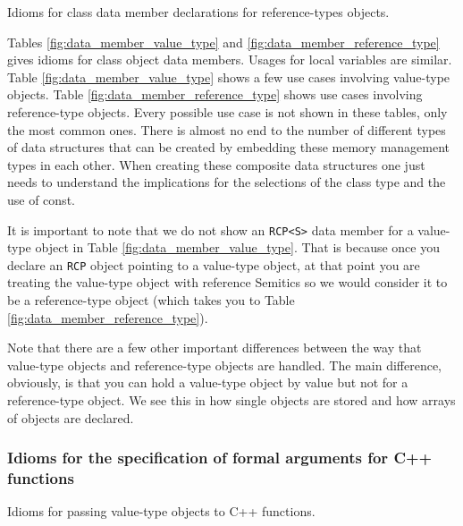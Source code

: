 \documentclass[pdf,ps2pdf,11pt]{SANDreport}
\begin{document}
\begin{table}
%
\begin{center}
%
%

%
%
\end{center}
\caption{\label{fig:data_member_reference_type}
Idioms for class data member declarations for reference-types
objects.}
%
\end{table}


Tables {}\ref{fig:data_member_value_type} and
{}\ref{fig:data_member_reference_type} gives idioms for class object
data members.  Usages for local variables are similar.  Table
{}\ref{fig:data_member_value_type} shows a few use cases involving
value-type objects.  Table {}\ref{fig:data_member_reference_type}
shows use cases involving reference-type objects.  Every possible use
case is not shown in these tables, only the most common ones.  There
is almost no end to the number of different types of data structures
that can be created by embedding these memory management types in each
other.  When creating these composite data structures one just needs
to understand the implications for the selections of the class type
and the use of const.

It is important to note that we do not show an {}\texttt{RCP<S>} data
member for a value-type object in Table
{}\ref{fig:data_member_value_type}.  That is because once you declare
an {}\texttt{RCP} object pointing to a value-type object, at that
point you are treating the value-type object with reference Semitics
so we would consider it to be a reference-type object (which takes you
to Table {}\ref{fig:data_member_reference_type}).

Note that there are a few other important differences between the way
that value-type objects and reference-type objects are handled.  The
main difference, obviously, is that you can hold a value-type object
by value but not for a reference-type object.  We see this in how
single objects are stored and how arrays of objects are declared.


%
{}\subsubsection{Idioms for the specification of formal arguments for
C++ functions}
\label{sec:idioms-for-passing-arguments}
%

\begin{table}[p]
%
\begin{center}
%
%

%
%
%
\end{center}
\caption{\label{fig:func_args_value_type}
Idioms for passing value-type objects to C++ functions.}
%
\end{table}
\end{document}
